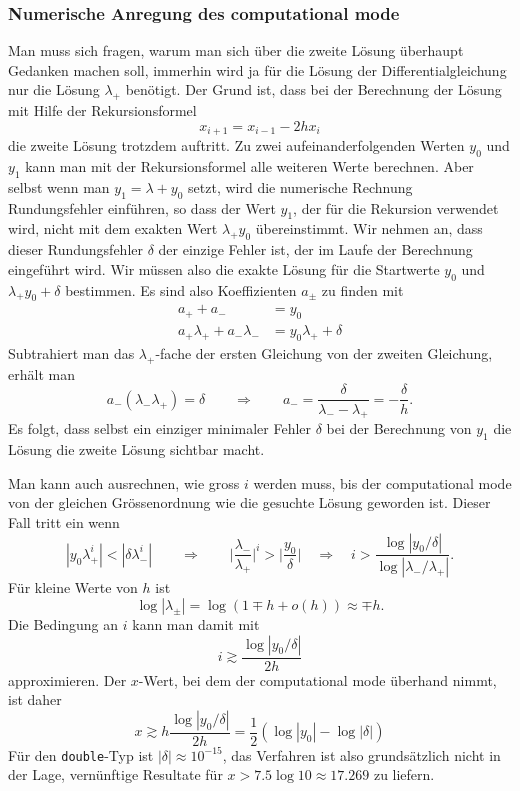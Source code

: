 \subsubsection{Numerische Anregung des computational mode}
%
Man muss sich fragen, warum man sich über die zweite Lösung überhaupt
Gedanken machen soll, immerhin wird ja für die Lösung der
Differentialgleichung nur die Lösung $\lambda_+$ benötigt.
Der Grund ist, dass bei der Berechnung der Lösung mit Hilfe der
Rekursionsformel
\[
x_{i+1} = x_{i-1}-2hx_i
\]
die zweite Lösung trotzdem auftritt.
Zu zwei aufeinanderfolgenden Werten $y_0$ und $y_1$ kann man mit der
Rekursionsformel alle weiteren Werte berechnen.
Aber selbst wenn man $y_1 = \lambda+y_0$ setzt, wird die numerische
Rechnung Rundungsfehler einführen, so dass der Wert $y_1$, der für die
Rekursion verwendet wird, nicht mit dem exakten Wert $\lambda_+y_0$
übereinstimmt.
%
Wir nehmen an, dass dieser Rundungsfehler $\delta$ der einzige
Fehler ist, der im Laufe der Berechnung eingeführt wird.
%
Wir müssen also die exakte Lösung für die Startwerte $y_0$ und
$\lambda_+y_0+\delta$ bestimmen.
Es sind also Koeffizienten $a_\pm$ zu finden mit
\begin{align*}
a_+ + a_- &= y_0 \\
a_+\lambda_+ + a_-\lambda_-&=y_0\lambda_++\delta
\end{align*}
Subtrahiert man das $\lambda_+$-fache der ersten Gleichung von der
zweiten Gleichung, erhält man
\[
a_-(\lambda_-\lambda_+)=\delta
\qquad\Rightarrow\qquad
a_- = \frac{\delta}{\lambda_--\lambda_+} = -\frac{\delta}{h}.
\]
Es folgt, dass selbst ein einziger minimaler Fehler $\delta$
bei der Berechnung von $y_1$ die Lösung die zweite Lösung sichtbar
macht. 

Man kann auch ausrechnen, wie gross $i$ werden muss, bis der
computational mode von der gleichen Grössenordnung wie die
gesuchte Lösung geworden ist.
Dieser Fall tritt ein wenn
\[
|y_0\lambda_+^i| < |\delta\lambda_-^i|
\qquad\Rightarrow\qquad
\biggl|
\frac{\lambda_-}{\lambda_+}
\biggr|^i
> \biggl|\frac{y_0}{\delta}\biggr|
\quad\Rightarrow\quad
i
>
\frac{\log |y_0/\delta|}{\log|\lambda_-/\lambda_+|}.
\]
Für kleine Werte von $h$ ist
\[
\log |\lambda_\pm|
=
\log(1\mp h+o(h)) 
\approx
\mp h.
\]
Die Bedingung an $i$ kann man damit mit
\[
i \gtrsim \frac{\log |y_0/\delta|}{2h}
\]
approximieren.
Der $x$-Wert, bei dem der computational mode überhand nimmt, ist daher
\[
x \gtrsim h \frac{\log|y_0/\delta|}{2h} = \frac12(\log|y_0|-\log|\delta|)
\]
Für den \texttt{double}-Typ ist $|\delta| \approx 10^{-15}$,
das Verfahren ist also grundsätzlich nicht in der Lage, vernünftige
Resultate für $x>7.5\log 10\approx 17.269$ zu liefern.

